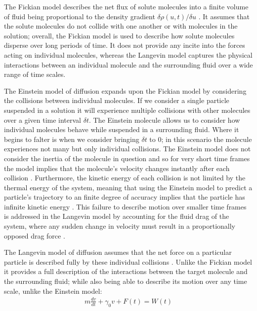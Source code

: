 The Fickian model describes the net flux of solute molecules into a finite
volume of fluid being proportional to the density gradient $\delta\rho(u,t)/\delta u$
\cite{Gillespie2012}. It assumes that the solute molecules do not collide with 
one another or with molecules in the solution; overall, the Fickian model is
used to describe how solute molecules disperse over long periods of time. It 
does not provide any incite into the forces acting on individual molecules, 
whereas the Langevin model captures the physical interactions between an 
individual molecule and the surrounding fluid over a wide range of time scales.

The Einstein model of diffusion expands upon the Fickian model by considering
the collisions between individual molecules. If we consider a single particle 
suspended in a solution it will experience multiple collisions with other 
molecules \cite{Gillespie2012a} over a given time interval $\delta t$. The 
Einstein molecule allows us to consider how individual molecules behave while
suspended in a surrounding fluid. Where it begins to falter is when we consider
bringing $\delta t$ to $0$; in this scenario the molecule experiences not many
but only individual collisions. The Einstein model does not consider the inertia 
of the molecule in question and so for very short time frames the model implies 
that the molecule's velocity changes instantly after each collision \cite{Gillespie2012a,
Gillespie2012b}. Furthermore, the kinetic energy of each collision is not limited
by the thermal energy of the system, meaning that using the Einstein model to 
predict a particle's trajectory to an finite degree of accuracy implies that 
the particle has infinite kinetic energy \cite{Gillespie2012b}. This failure to 
describe motion over smaller time frames is addressed in the Langevin model by 
accounting for the fluid drag of the system, where any sudden change in velocity 
must result in a proportionally opposed drag force \cite{Gillespie2012c}. 

The Langevin model of diffusion assumes that the net force on a particular 
particle is described fully by these individual collisions \cite{Gillespie2012c}. 
Unlike the Fickian model it provides a full description of the interactions 
between the target molecule and the surrounding fluid; while also being able
to describe its motion over any time scale, unlike the Einstein model:
\begin{align}
	m\frac{dv}{dt} + \gamma_0 v + F(t) = W(t)
\end{align}

